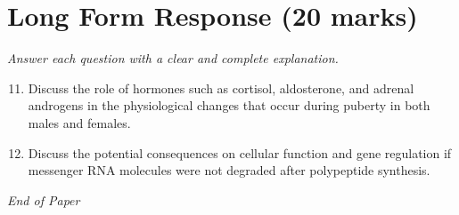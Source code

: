 \documentclass[12pt]{article}
\begin{document}
\section*{Long Form Response (20 marks)}
\textit{Answer each question with a clear and complete explanation.}
\begin{enumerate}[label=\arabic*.]
\setcounter{enumi}{10}
\item Discuss the role of hormones such as cortisol, aldosterone, and adrenal androgens in the physiological changes that occur during puberty in both males and females.
\item Discuss the potential consequences on cellular function and gene regulation if messenger RNA molecules were not degraded after polypeptide synthesis.
\end{enumerate}

\vfill
\noindent\textit{End of Paper}
\end{document}
